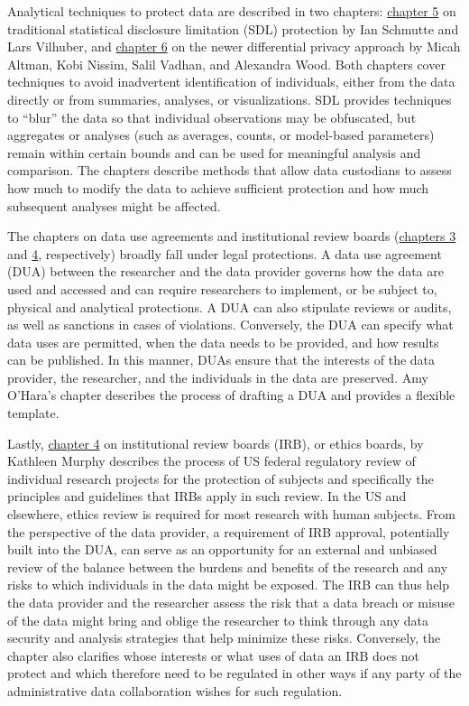 \documentclass[
]{book}
\begin{document}
Analytical techniques to protect data are described in two chapters: \protect\hyperlink{discavoid}{chapter 5} on traditional statistical disclosure limitation (SDL) protection by Ian Schmutte and Lars Vilhuber, and \protect\hyperlink{diffpriv}{chapter 6} on the newer differential privacy approach by Micah Altman, Kobi Nissim, Salil Vadhan, and Alexandra Wood. Both chapters cover techniques to avoid inadvertent identification of individuals, either from the data directly or from summaries, analyses, or visualizations. SDL provides techniques to ``blur'' the data so that individual observations may be obfuscated, but aggregates or analyses (such as averages, counts, or model-based parameters) remain within certain bounds and can be used for meaningful analysis and comparison. The chapters describe methods that allow data custodians to assess how much to modify the data to achieve sufficient protection and how much subsequent analyses might be affected.

The chapters on data use agreements and institutional review boards (\protect\hyperlink{dua}{chapters 3} and \protect\hyperlink{irb}{4}, respectively) broadly fall under legal protections. A data use agreement (DUA) between the researcher and the data provider governs how the data are used and accessed and can require researchers to implement, or be subject to, physical and analytical protections. A DUA can also stipulate reviews or audits, as well as sanctions in cases of violations. Conversely, the DUA can specify what data uses are permitted, when the data needs to be provided, and how results can be published. In this manner, DUAs ensure that the interests of the data provider, the researcher, and the individuals in the data are preserved. Amy O'Hara's chapter describes the process of drafting a DUA and provides a flexible template.

Lastly, \protect\hyperlink{irb}{chapter 4} on institutional review boards (IRB), or ethics boards, by Kathleen Murphy describes the process of US federal regulatory review of individual research projects for the protection of subjects and specifically the principles and guidelines that IRBs apply in such review. In the US and elsewhere, ethics review is required for most research with human subjects. From the perspective of the data provider, a requirement of IRB approval, potentially built into the DUA, can serve as an opportunity for an external and unbiased review of the balance between the burdens and benefits of the research and any risks to which individuals in the data might be exposed. The IRB can thus help the data provider and the researcher assess the risk that a data breach or misuse of the data might bring and oblige the researcher to think through any data security and analysis strategies that help minimize these risks. Conversely, the chapter also clarifies whose interests or what uses of data an IRB does not protect and which therefore need to be regulated in other ways if any party of the administrative data collaboration wishes for such regulation.
\end{document}
